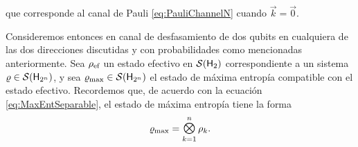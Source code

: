 que corresponde al canal de Pauli \ref{eq:PauliChannelN} cuando $\vec{k}=\vec{0}$.   

Consideremos entonces en canal de desfasamiento de dos qubits en cualquiera de las dos direcciones discutidas y con probabilidades como mencionadas anteriormente. Sea $\rho_{\text{ef}}$ un estado efectivo en $\mathcal{S}({\sf H}_{2})$ correspondiente a un sistema $\varrho \in \mathcal{S}({\sf H}_{2^{n}})$, y sea $\varrho_{\max}\in\mathcal{S}({\sf H}_{2^{n}})$ el estado de máxima entropía compatible con el estado efectivo. Recordemos que, de acuerdo con la ecuación \ref{eq:MaxEntSeparable}, el estado de máxima entropía tiene la forma
\begin{equation}
    \varrho_{\max}=\Motimes_{k=1}^{n}\rho_{k}.\nonumber
\end{equation}

